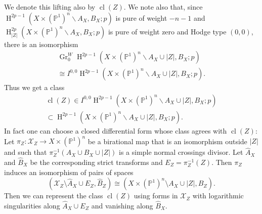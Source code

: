 \documentclass[11pt,a4paper]{amsart}
\renewcommand{\P}{\mathds{P}}
\newcommand{\caX}{\mathcal{X}}
\DeclareMathOperator {\Gr} {Gr}
\DeclareMathOperator {\cl}{cl}
\DeclareMathOperator{\rH}{H}
\numberwithin{equation}{section}
\theoremstyle{plain}
\theoremstyle{definition}
\begin{document}
We denote this lifting also by
$\cl(Z)$.
We note also that, since
$\rH^{2p-1}(X\times (\P^1)^{n}\smallsetminus A_{X},B_{X}; p)$ is pure
of weight $-n-1$ and $\rH^{2p}_{|Z|}(X\times
(\P^1)^n\smallsetminus A_{X}, B_{X}; p)$ is pure of weight zero and
Hodge type $(0,0)$, there
is an isomorphism
\begin{multline*}
  \Gr_{0}^{W}\rH^{2p-1}(X\times (\P^1)^n\smallsetminus
  A_{X}\cup |Z|,B_{X}; p)\\ \cong
  I^{0,0} \rH^{2p-1}(X\times (\P^1)^n\smallsetminus
  A_{X}\cup |Z|,B_{X}; p).
\end{multline*}
Thus we get a class
\begin{multline*}
  \cl(Z)\in I^{0,0} \rH^{2p-1}(X\times (\P^1)^n\smallsetminus
  A_{X}\cup |Z|,B_{X}; p)\\ \subset \rH^{2p-1}(X\times (\P^1)^n\smallsetminus
  A_{X}\cup |Z|,B_{X}; p).
\end{multline*}
 In fact one can choose a closed differential form whose
class agrees with $\cl(Z)$: Let $\pi_{Z}\colon \caX_{Z}\rightarrow
X\times (\P^1)^{n}$ be a birational map that is an isomorphism outside
$|Z|$  and such that $\pi _{Z}^{-1}(A_X\cup B_X\cup |Z|)$ is a simple
normal crossings divisor. Let 
$\widehat{A}_{X}$ and $\widehat{B}_{X}$ be the corresponding strict
transforms and $E_Z=\pi ^{-1}_{Z}(Z)$. Then $\pi _{Z}$ induces an
isomorphism of pairs of spaces 
\begin{displaymath}
  (\caX_{Z}\setminus \widehat A_{X}\cup E_{Z},\widehat B_{Z})
  \cong
  (X\times (\P^{1})^{n}\setminus A_{X}\cup |Z|,B_{Z}).
\end{displaymath}
Then we can represent the class $\cl(Z)$ using forms in $\caX_{Z}$
with logarithmic singularities along $\widehat A_{X}\cup E_{Z}$ and
vanishing along $\widehat B_{X}$. 
\end{document}
